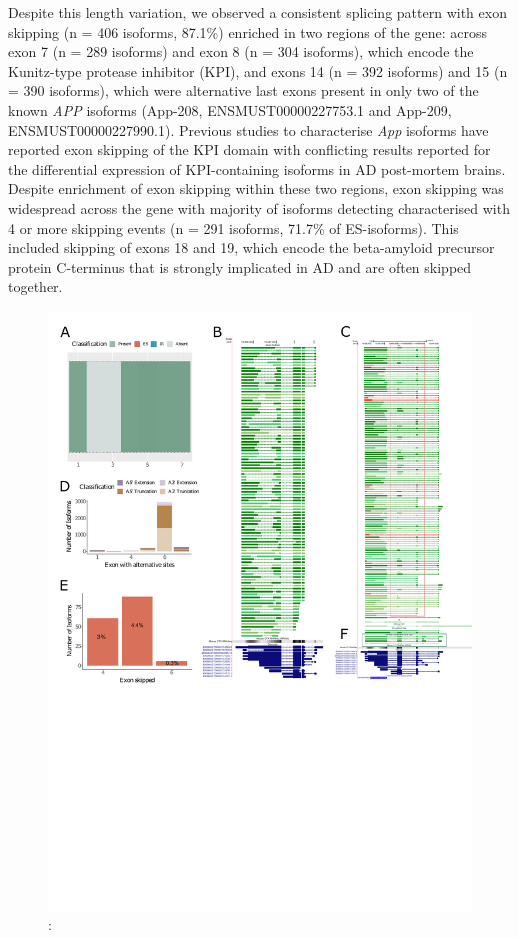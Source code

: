 Despite this length variation, we observed a consistent splicing pattern with exon skipping (n = 406 isoforms, 87.1\%) enriched in two regions of the gene: across exon 7 (n = 289 isoforms) and exon 8 (n = 304 isoforms), which encode the Kunitz-type protease inhibitor (KPI), and exons 14 (n = 392 isoforms) and 15 (n = 390 isoforms), which were alternative last exons present in only two of the known \textit{APP} isoforms (App-208, ENSMUST00000227753.1 and App-209, ENSMUST00000227990.1). Previous studies to characterise \textit{App} isoforms have reported exon skipping of the KPI domain with conflicting results reported for the differential expression of KPI-containing isoforms in AD post-mortem brains. Despite enrichment of exon skipping within these two regions, exon skipping was widespread across the gene with majority of isoforms detecting characterised with 4 or more skipping events (n = 291 isoforms, 71.7\% of ES-isoforms). This included skipping of exons 18 and 19, which encode the beta-amyloid precursor protein C-terminus that is strongly implicated in AD and are often skipped together.   

\begin{figure}[htp]
	\begin{center}
		\includegraphics[page=2,trim={0 1cm 0 0},scale = 0.85]{Figures/TargetGenes_Annotation_Portrait.pdf}
	\end{center}
	\captionsetup{width=0.95\textwidth}
	\caption[RNA-Seq defined transcriptome]%
	{\textbf{}: }   
	\label{fig:app}
\end{figure}

